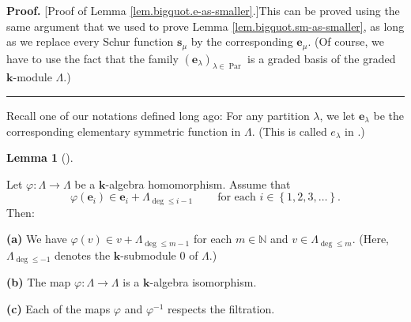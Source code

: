 \documentclass[numbers=enddot,12pt,final,onecolumn,notitlepage]{scrartcl}%
\theoremstyle{definition}
\newtheorem{lem}[theo]{Lemma}
\newenvironment{lemma}[1][]
{\begin{lem}[#1]\begin{leftbar}}
{\end{leftbar}\end{lem}}
\newenvironment{proof}[1][Proof]{\noindent\textbf{#1.} }{\ \rule{0.5em}{0.5em}}
\begin{document}
\begin{proof}
[Proof of Lemma \ref{lem.bigquot.e-as-smaller}.]This can be proved using the
same argument that we used to prove Lemma \ref{lem.bigquot.sm-as-smaller}, as
long as we replace every Schur function $\mathbf{s}_{\mu}$ by the
corresponding $\mathbf{e}_{\mu}$. (Of course, we have to use the fact that the
family $\left(  \mathbf{e}_{\lambda}\right)  _{\lambda\in\operatorname*{Par}}$
is a graded basis of the graded $\mathbf{k}$-module $\Lambda$.)
\end{proof}

Recall one of our notations defined long ago: For any partition $\lambda$, we
let $\mathbf{e}_{\lambda}$ be the corresponding elementary symmetric function
in $\Lambda$. (This is called $e_{\lambda}$ in \cite[Definition 2.2.1]%
{GriRei18}.)

\begin{lemma}
\label{lem.bigquot.filtr-hom}Let $\varphi:\Lambda\rightarrow\Lambda$ be a
$\mathbf{k}$-algebra homomorphism. Assume that%
\begin{equation}
\varphi\left(  \mathbf{e}_{i}\right)  \in\mathbf{e}_{i}+\Lambda_{\deg\leq
i-1}\ \ \ \ \ \ \ \ \ \ \text{for each }i\in\left\{  1,2,3,\ldots\right\}  .
\label{eq.lem.bigquot.filtr-hom.ass}%
\end{equation}
Then:

\textbf{(a)} We have $\varphi\left(  v\right)  \in v+\Lambda_{\deg\leq m-1}$
for each $m\in\mathbb{N}$ and $v\in\Lambda_{\deg\leq m}$. (Here,
$\Lambda_{\deg\leq-1}$ denotes the $\mathbf{k}$-submodule $0$ of $\Lambda$.)

\textbf{(b)} The map $\varphi:\Lambda\rightarrow\Lambda$ is a $\mathbf{k}%
$-algebra isomorphism.

\textbf{(c)} Each of the maps $\varphi$ and $\varphi^{-1}$ respects the filtration.
\end{lemma}
\end{document}
